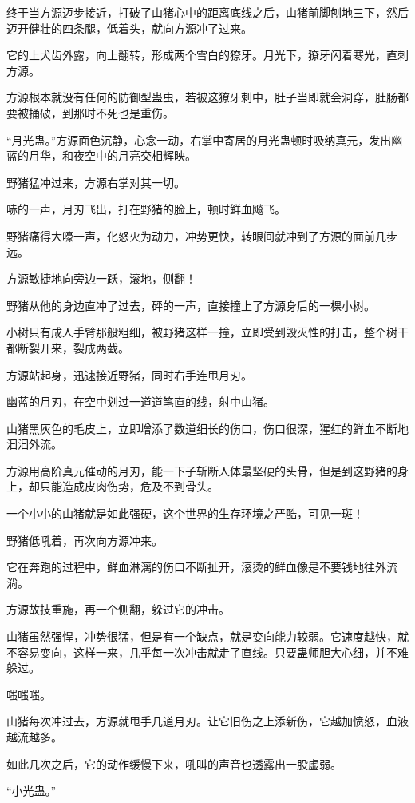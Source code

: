 \begin{this_body}
终于当方源迈步接近，打破了山猪心中的距离底线之后，山猪前脚刨地三下，然后迈开健壮的四条腿，低着头，就向方源冲了过来。

它的上犬齿外露，向上翻转，形成两个雪白的獠牙。月光下，獠牙闪着寒光，直刺方源。

方源根本就没有任何的防御型蛊虫，若被这獠牙刺中，肚子当即就会洞穿，肚肠都要被捅破，到那时不死也是重伤。

“月光蛊。”方源面色沉静，心念一动，右掌中寄居的月光蛊顿时吸纳真元，发出幽蓝的月华，和夜空中的月亮交相辉映。

野猪猛冲过来，方源右掌对其一切。

哧的一声，月刃飞出，打在野猪的脸上，顿时鲜血飚飞。

野猪痛得大嚎一声，化怒火为动力，冲势更快，转眼间就冲到了方源的面前几步远。

方源敏捷地向旁边一跃，滚地，侧翻！

野猪从他的身边直冲了过去，砰的一声，直接撞上了方源身后的一棵小树。

小树只有成人手臂那般粗细，被野猪这样一撞，立即受到毁灭性的打击，整个树干都断裂开来，裂成两截。

方源站起身，迅速接近野猪，同时右手连甩月刃。

幽蓝的月刃，在空中划过一道道笔直的线，射中山猪。

山猪黑灰色的毛皮上，立即增添了数道细长的伤口，伤口很深，猩红的鲜血不断地汩汩外流。

方源用高阶真元催动的月刃，能一下子斩断人体最坚硬的头骨，但是到这野猪的身上，却只能造成皮肉伤势，危及不到骨头。

一个小小的山猪就是如此强硬，这个世界的生存环境之严酷，可见一斑！

野猪低吼着，再次向方源冲来。

它在奔跑的过程中，鲜血淋漓的伤口不断扯开，滚烫的鲜血像是不要钱地往外流淌。

方源故技重施，再一个侧翻，躲过它的冲击。

山猪虽然强悍，冲势很猛，但是有一个缺点，就是变向能力较弱。它速度越快，就不容易变向，这样一来，几乎每一次冲击就走了直线。只要蛊师胆大心细，并不难躲过。

嗤嗤嗤。

山猪每次冲过去，方源就甩手几道月刃。让它旧伤之上添新伤，它越加愤怒，血液越流越多。

如此几次之后，它的动作缓慢下来，吼叫的声音也透露出一股虚弱。

“小光蛊。”


\end{this_body}
